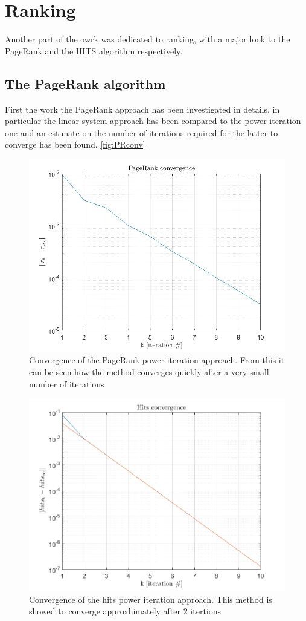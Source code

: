 \documentclass[12pt,a4paper]{article}
\begin{document}
\section*{Ranking}
Another part of the owrk was dedicated to ranking, with a major look to the PageRank and the HITS algorithm respectively.
\subsection*{The PageRank algorithm}
First the work the PageRank approach has been investigated in details, in particular the linear system approach has been compared to the power iteration one and an estimate on the number of iterations required for the latter to converge has been found. \autoref{fig:PRconv}
\begin{figure}
  \includegraphics[width = .6\textwidth]{img/PageRank_Convergence}
  \caption{Convergence of the PageRank power iteration approach. From this it can be seen how the method converges quickly after a very small number of iterations}
  \label{fig:PRconv}
\end{figure}
\begin{figure}
  \includegraphics[width = .6\textwidth]{img/Convergence_hits}
  \caption{Convergence of the hits power iteration approach. This method is showed to converge approxhimately after 2 itertions}
  \label{fig:hitsConv}
\end{figure}
\end{document}
